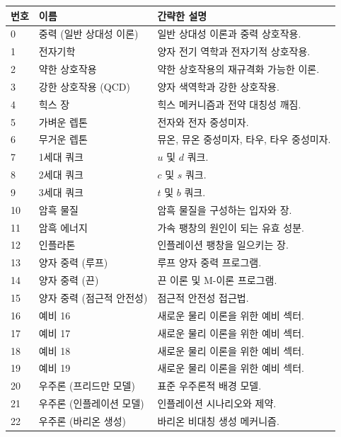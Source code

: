 \documentclass[13pt,a4paper]{article}
\begin{document}
	\begin{longtable}{|p{0.9cm}|p{6.0cm}|p{8.6cm}|}
		\hline
		\textbf{번호} & \textbf{이름} & \textbf{간략한 설명} \\
		\hline
		\endhead
		0 & 중력 (일반 상대성 이론) & 일반 상대성 이론과 중력 상호작용. \\
		\hline
		1 & 전자기학 & 양자 전기 역학과 전자기적 상호작용. \\
		\hline
		2 & 약한 상호작용 & 약한 상호작용의 재규격화 가능한 이론. \\
		\hline
		3 & 강한 상호작용 (QCD) & 양자 색역학과 강한 상호작용. \\
		\hline
		4 & 힉스 장 & 힉스 메커니즘과 전약 대칭성 깨짐. \\
		\hline
		5 & 가벼운 렙톤 & 전자와 전자 중성미자. \\
		\hline
		6 & 무거운 렙톤 & 뮤온, 뮤온 중성미자, 타우, 타우 중성미자. \\
		\hline
		7 & 1세대 쿼크 & $u$ 및 $d$ 쿼크. \\
		\hline
		8 & 2세대 쿼크 & $c$ 및 $s$ 쿼크. \\
		\hline
		9 & 3세대 쿼크 & $t$ 및 $b$ 쿼크. \\
		\hline
		10 & 암흑 물질 & 암흑 물질을 구성하는 입자와 장. \\
		\hline
		11 & 암흑 에너지 & 가속 팽창의 원인이 되는 유효 성분. \\
		\hline
		12 & 인플라톤 & 인플레이션 팽창을 일으키는 장. \\
		\hline
		13 & 양자 중력 (루프) & 루프 양자 중력 프로그램. \\
		\hline
		14 & 양자 중력 (끈) & 끈 이론 및 M-이론 프로그램. \\
		\hline
		15 & 양자 중력 (점근적 안전성) & 점근적 안전성 접근법. \\
		\hline
		16 & 예비 16 & 새로운 물리 이론을 위한 예비 섹터. \\
		\hline
		17 & 예비 17 & 새로운 물리 이론을 위한 예비 섹터. \\
		\hline
		18 & 예비 18 & 새로운 물리 이론을 위한 예비 섹터. \\
		\hline
		19 & 예비 19 & 새로운 물리 이론을 위한 예비 섹터. \\
		\hline
		20 & 우주론 (프리드만 모델) & 표준 우주론적 배경 모델. \\
		\hline
		21 & 우주론 (인플레이션 모델) & 인플레이션 시나리오와 제약. \\
		\hline
		22 & 우주론 (바리온 생성) & 바리온 비대칭 생성 메커니즘. \\

\end{longtable}
\end{document}
